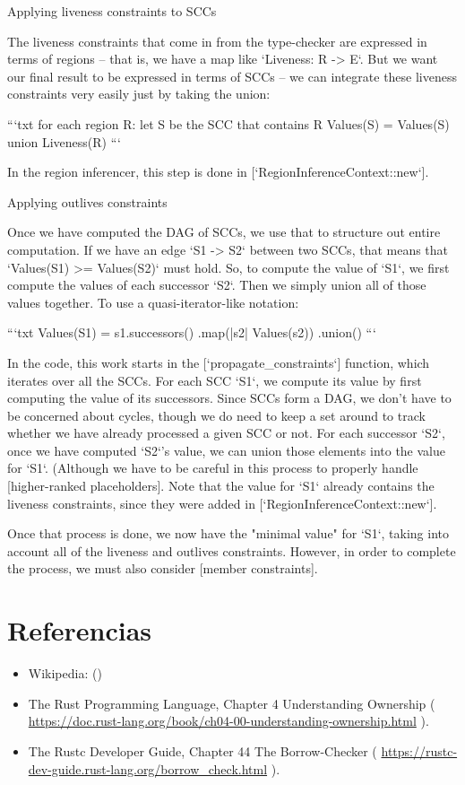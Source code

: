 \documentclass[11pt, a4paper]{article}
\begin{document}
Applying liveness constraints to SCCs

The liveness constraints that come in from the type-checker are
expressed in terms of regions -- that is, we have a map like
`Liveness: R -> {E}`.  But we want our final result to be expressed
in terms of SCCs -- we can integrate these liveness constraints very
easily just by taking the union:

```txt
for each region R:
  let S be the SCC that contains R
  Values(S) = Values(S) union Liveness(R)
```

In the region inferencer, this step is done in [`RegionInferenceContext::new`].

Applying outlives constraints

Once we have computed the DAG of SCCs, we use that to structure out
entire computation. If we have an edge `S1 -> S2` between two SCCs,
that means that `Values(S1) >= Values(S2)` must hold. So, to compute
the value of `S1`, we first compute the values of each successor `S2`.
Then we simply union all of those values together. To use a
quasi-iterator-like notation:

```txt
Values(S1) =
  s1.successors()
    .map(|s2| Values(s2))
    .union()
```

In the code, this work starts in the [`propagate\_constraints`]
function, which iterates over all the SCCs. For each SCC `S1`, we
compute its value by first computing the value of its
successors. Since SCCs form a DAG, we don't have to be concerned about
cycles, though we do need to keep a set around to track whether we
have already processed a given SCC or not. For each successor `S2`, once
we have computed `S2`'s value, we can union those elements into the
value for `S1`. (Although we have to be careful in this process to
properly handle [higher-ranked
placeholders]. 
Note that the value
for `S1` already contains the liveness constraints, since they were
added in [`RegionInferenceContext::new`].

Once that process is done, we now have the "minimal value" for `S1`,
taking into account all of the liveness and outlives
constraints. However, in order to complete the process, we must also
consider [member constraints].

\section{Referencias}

\begin{itemize}
\item Wikipedia: (\url{})
\item The Rust Programming Language, Chapter 4 Understanding Ownership 
      ( \url{https://doc.rust-lang.org/book/ch04-00-understanding-ownership.html} ). 
\item The Rustc Developer Guide, Chapter 44 The Borrow-Checker 
      ( \url{https://rustc-dev-guide.rust-lang.org/borrow_check.html} ). 
\end{itemize}
\end{document}
